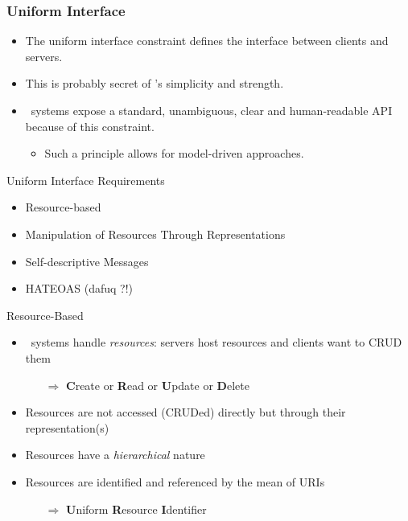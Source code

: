 \begin{frame}[allowframebreaks]
	\frametitle{Uniform Interface}
	
	\begin{itemize}
		\item The uniform interface constraint defines the interface between clients and servers. 
		\item This is probably secret of \rest's simplicity and strength.
		\item \restful\ systems expose a standard, unambiguous, clear and human-readable API because of this constraint.
			\begin{itemize}
				\item Such a principle allows for model-driven approaches. 
			\end{itemize}
	\end{itemize}
	
	\begin{block}{Uniform Interface Requirements}
		\begin{itemize}
			\item Resource-based
			\item Manipulation of Resources Through Representations
			\item Self-descriptive Messages
			\item HATEOAS (dafuq ?!)
			
		\end{itemize}
	\end{block}
	
	\framebreak
	
	
	\begin{block}{Resource-Based}
		\begin{itemize}
			\item \restful\ systems handle \emph{resources}: servers host resources and clients want to CRUD them
			\begin{itemize}
				\item[$\Rightarrow$] \textbf{C}reate or \textbf{R}ead or \textbf{U}pdate or \textbf{D}elete
			\end{itemize}
			\item Resources are not accessed (CRUDed) directly but through their representation(s)
			\item Resources have a \emph{hierarchical} nature
			\item Resources are identified and referenced by the mean of URIs
				\begin{itemize}
					\item[$\Rightarrow$] \textbf{U}niform \textbf{R}esource \textbf{I}dentifier
				\end{itemize}
			

\end{itemize}
\end{block}
\end{frame}
